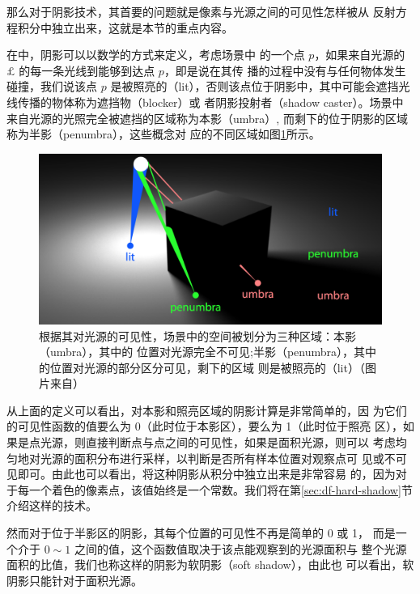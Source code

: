 那么对于阴影技术，其首要的问题就是像素与光源之间的可见性怎样被从 反射方程积分中独立出来，这就是本节的重点内容。

在\cite{b:rts}中，阴影可以以数学的方式来定义，考虑场景中 的一个点 ${p}$，如果来自光源的 $\pounds$ 的每一条光线到能够到达点 ${p}$，即是说在其传 播的过程中没有与任何物体发生碰撞，我们说该点 ${p}$ 是被照亮的（lit），否则该点位于阴影中，其中可能会遮挡光线传播的物体称为遮挡物（blocker）或 者阴影投射者（shadow caster）。场景中来自光源的光照完全被遮挡的区域称为本影（umbra）, 而剩下的位于阴影的区域称为半影（penumbra），这些概念对 应的不同区域如图\ref{f:df-shadow-definition}所示。

\begin{figure}
\begin{center}
	\includegraphics[width=.8\textwidth]{figures/shadows/shadow-definition}
	\end{center}
	\caption{根据其对光源的可见性，场景中的空间被划分为三种区域：本影（umbra），其中的 位置对光源完全不可见;半影（penumbra），其中的位置对光源的部分区分可见，剩下的区域 则是被照亮的（lit）（图片来自\cite{b:rts}）}
	\label{f:df-shadow-definition}
\end{figure}

从上面的定义可以看出，对本影和照亮区域的阴影计算是非常简单的，因 为它们的可见性函数的值要么为 0（此时位于本影区），要么为 1（此时位于照亮 区），如果是点光源，则直接判断点与点之间的可见性，如果是面积光源，则可以 考虑均匀地对光源的面积分布进行采样，以判断是否所有样本位置对观察点可 见或不可见即可。由此也可以看出，将这种阴影从积分中独立出来是非常容易 的，因为对于每一个着色的像素点，该值始终是一个常数。我们将在第\ref{sec:df-hard-shadow}节 介绍这样的技术。

然而对于位于半影区的阴影，其每个位置的可见性不再是简单的 0 或 1， 而是一个介于 $0\sim 1$ 之间的值，这个函数值取决于该点能观察到的光源面积与 整个光源面积的比值，我们也称这样的阴影为软阴影（soft shadow），由此也 可以看出，软阴影只能针对于面积光源。

